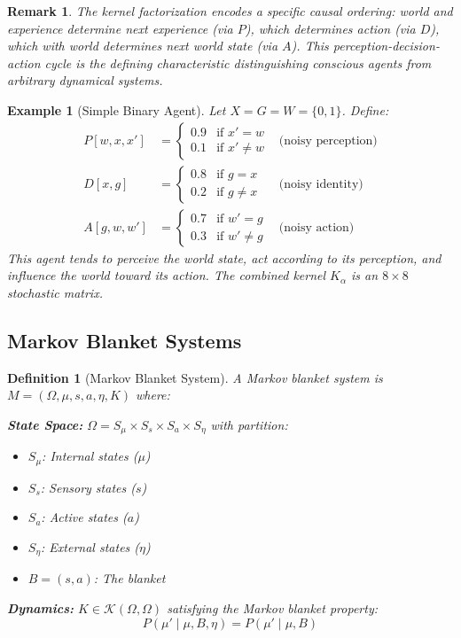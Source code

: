 \documentclass[11pt,a4paper]{article}
\newtheorem{definition}[theorem]{Definition}
\newtheorem{example}[theorem]{Example}
\newtheorem*{remark}{Remark}
\newcommand{\Kern}{\mathcal{K}}
\begin{document}
\begin{remark}
The kernel factorization encodes a specific causal ordering: world and experience determine next experience (via $P$), which determines action (via $D$), which with world determines next world state (via $A$). This perception-decision-action cycle is the defining characteristic distinguishing conscious agents from arbitrary dynamical systems.
\end{remark}

\begin{example}[Simple Binary Agent]\label{ex:binary}
Let $X = G = W = \{0, 1\}$. Define:
\begin{align*}
P[w, x, x'] &= \begin{cases} 0.9 & \text{if } x' = w \\ 0.1 & \text{if } x' \neq w \end{cases} & \text{(noisy perception)}\\
D[x, g] &= \begin{cases} 0.8 & \text{if } g = x \\ 0.2 & \text{if } g \neq x \end{cases} & \text{(noisy identity)}\\
A[g, w, w'] &= \begin{cases} 0.7 & \text{if } w' = g \\ 0.3 & \text{if } w' \neq g \end{cases} & \text{(noisy action)}
\end{align*}
This agent tends to perceive the world state, act according to its perception, and influence the world toward its action. The combined kernel $K_\alpha$ is an $8 \times 8$ stochastic matrix.
\end{example}

\subsection{Markov Blanket Systems}

\begin{definition}[Markov Blanket System]\label{def:mb}
A \emph{Markov blanket system} is $M = (\Omega, \mu, s, a, \eta, K)$ where:

\textbf{State Space:} $\Omega = S_\mu \times S_s \times S_a \times S_\eta$ with partition:
\begin{itemize}[nosep]
    \item $S_\mu$: Internal states ($\mu$)
    \item $S_s$: Sensory states ($s$)
    \item $S_a$: Active states ($a$)
    \item $S_\eta$: External states ($\eta$)
    \item $B = (s, a)$: The blanket
\end{itemize}

\textbf{Dynamics:} $K \in \Kern(\Omega, \Omega)$ satisfying the \emph{Markov blanket property}:
\begin{equation}\label{eq:mb-property}
P(\mu' \mid \mu, B, \eta) = P(\mu' \mid \mu, B)
\end{equation}
\end{definition}
\end{document}
